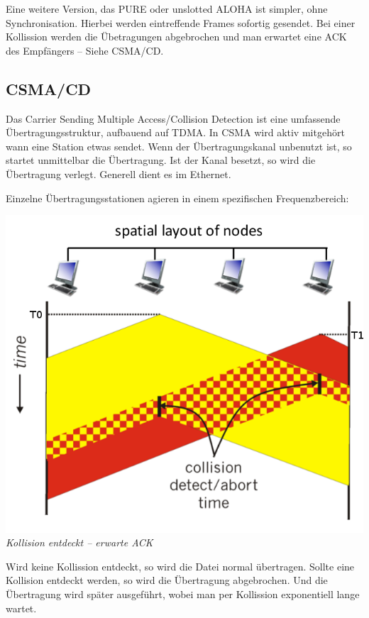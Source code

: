 \documentclass{scrartcl}
\begin{document}
    Eine weitere Version, das PURE oder unslotted ALOHA ist simpler, ohne Synchronisation. Hierbei werden eintreffende Frames sofortig gesendet.
    Bei einer Kollission werden die Übetragungen abgebrochen und man erwartet eine ACK des Empfängers -- Siehe CSMA/CD.
    
    \subsection{CSMA/CD}
    Das Carrier Sending Multiple Access/Collision Detection ist eine umfassende Übertragungsstruktur, aufbauend auf TDMA.
    In CSMA wird aktiv mitgehört wann eine Station etwas sendet. Wenn der Übertragungskanal unbenutzt ist, so startet unmittelbar die Übertragung. Ist der Kanal besetzt, so wird die Übertragung verlegt. Generell dient es im Ethernet.
    
    Einzelne Übertragungsstationen agieren in einem spezifischen Frequenzbereich:
    \begin{center}
        \includegraphics[width=\textwidth]{CSMACD.png}\\
        \textit{Kollision entdeckt -- erwarte ACK}
    \end{center}
    
    Wird keine Kollission entdeckt, so wird die Datei normal übertragen. Sollte eine Kollision entdeckt werden, so wird die Übertragung abgebrochen. Und die Übertragung wird später ausgeführt, wobei man per Kollission exponentiell lange wartet.
    
\end{document}
